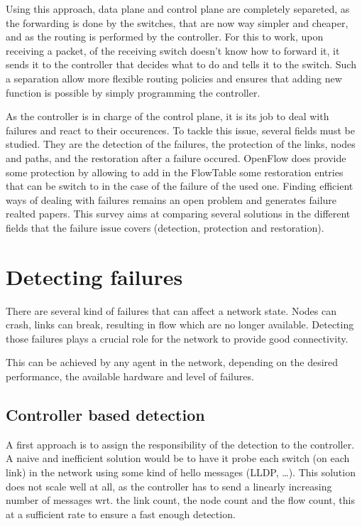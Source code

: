 \documentclass[compsoc]{IEEEtran}
\begin{document}
Using this approach, data plane and control plane are completely separeted, as the forwarding is done by the switches, that are now way simpler and cheaper, and as the routing is performed by the controller. For this to work, upon receiving a packet, of the receiving switch doesn't know how to forward it, it sends it to the controller that decides what to do and tells it to the switch. Such a separation allow more flexible routing policies and ensures that adding new function is possible by simply programming the controller.

As the controller is in charge of the control plane, it is its job to deal with failures and react to their occurences. To tackle this issue, several fields must be studied. They are the detection of the failures, the protection of the links, nodes and paths, and the restoration after a failure occured. OpenFlow does provide some protection by allowing to add in the FlowTable some restoration entries that can be switch to in the case of the failure of the used one. Finding efficient ways of dealing with failures remains an open problem and generates failure realted papers. This survey aims at comparing several solutions in the different fields that the failure issue covers (detection, protection and restoration).

\section{Detecting failures}
There are several kind of failures that can affect a network state. Nodes can crash, links can break, resulting in flow which are no longer available. Detecting those failures plays a crucial role for the network to provide good connectivity.

This can be achieved by any agent in the network, depending on the desired performance, the available hardware and level of failures.

\subsection{Controller based detection}
A first approach is to assign the responsibility of the detection to the controller. A naive and inefficient solution would be to have it probe each switch (on each link) in the network using some kind of hello messages (LLDP, \ldots). This solution does not scale well at all, as the controller has to send a linearly increasing number of messages wrt. the link count, the node count and the flow count, this at a sufficient rate to ensure a fast enough detection.
\end{document}

